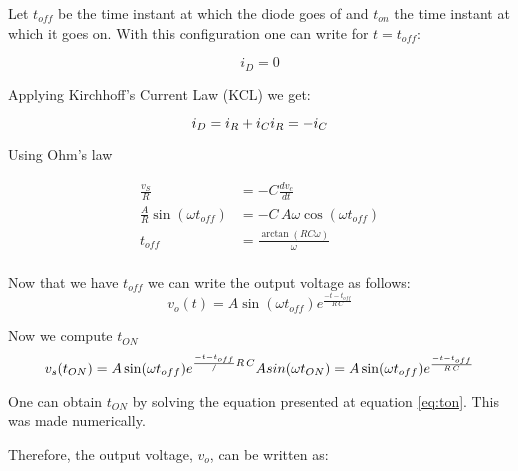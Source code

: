 Let $t_{off}$ be the time instant at which the diode goes of and $t_{on}$ the time instant at which it goes on. With this configuration one can write for $t=t_{off}$:

\begin{equation}
  i_D=0
\end{equation}

Applying Kirchhoff's Current Law (KCL) we get:

\begin{equation}
  i_D=i_R+i_C\\
  i_R=-i_C
\end{equation}

Using Ohm's law

\begin{equation}
\begin{split}
  \frac{v_S}{R} &=-C\frac{dv_c}{dt}\\
  \frac{A}{R}\sin(\omega t_{off}) &= - C \,A \omega \cos(\omega t_{off}) \\
  t_{off} &=\frac{\arctan(RC\omega)}{\omega}\\
\end{split}
\end{equation}

Now that we have $t_{off}$ we can write the output voltage as follows:
\begin{equation}
v_o(t)=A  \sin(\omega t_{off})  e^{\frac{-t-t_{off}}{R\,C}}
\end{equation}


Now we compute $t_{ON}$
\begin{equation}
	v_s(t_{ON})=A  \sin(\omega t_{off})  e^{\frac{-t-t_{off}}/{R\,C}}\\
	A sin(\omega t_{ON})=A  \sin(\omega t_{off})  e^{\frac{-t-t_{off}}{R\,C}}
\label{eq:ton}
\end{equation}

One can obtain $t_{ON}$ by solving the equation presented at equation \ref{eq:ton}. This was made numerically.

Therefore, the output voltage, $v_o$, can be written as:

